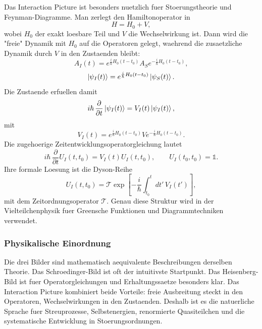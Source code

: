 Das Interaction Picture ist besonders nuetzlich
fuer Stoerungstheorie und Feynman-Diagramme. Man
zerlegt den Hamiltonoperator in
\begin{equation}
  H=H_0+V,
\end{equation}
wobei $H_0$ der exakt loesbare Teil und $V$ die Wechselwirkung ist. Dann wird die "freie" Dynamik mit $H_0$ auf die Operatoren gelegt, waehrend die zusaetzliche Dynamik durch $V$ in den Zustaenden bleibt:
\begin{equation}
  A_I(t)=e^{\frac{i}{\hbar}H_0(t-t_0)}A_Se^{-\frac{i}{\hbar}H_0(t-t_0)},
\end{equation}
\begin{equation}
  \left|\psi_I(t)\right\rangle=e^{\frac{i}{\hbar}H_0(t-t_0)}\left|\psi_S(t)\right\rangle.
\end{equation}
Die Zustaende erfuellen damit
\begin{equation}
  i\hbar\,\frac{\partial}{\partial t}\left|\psi_I(t)\right\rangle=V_I(t)\left|\psi_I(t)\right\rangle,
\end{equation}
mit
\begin{equation}
  V_I(t)=e^{\frac{i}{\hbar}H_0(t-t_0)}Ve^{-\frac{i}{\hbar}H_0(t-t_0)}.
\end{equation}
Die zugehoerige Zeitentwicklungsoperatorgleichung lautet
\begin{equation}
  i\hbar\,\frac{\partial}{\partial t}U_I(t,t_0)=V_I(t)U_I(t,t_0),
  \qquad U_I(t_0,t_0)=\mathds{1}.
\end{equation}
Ihre formale Loesung ist die Dyson-Reihe
\begin{equation}
  U_I(t,t_0)=\mathcal{T}\exp\left[-\frac{i}{\hbar}\int_{t_0}^{t}dt'\,V_I(t')\right],
\end{equation}
mit dem Zeitordnungsoperator $\mathcal{T}$. Genau diese Struktur wird in der Vielteilchenphysik fuer Greensche Funktionen und Diagrammtechniken verwendet.

\subsubsection*{Physikalische Einordnung}

Die drei Bilder sind mathematisch aequivalente
Beschreibungen derselben Theorie. Das
Schroedinger-Bild ist oft der intuitivste
Startpunkt. Das Heisenberg-Bild ist fuer
Operatorgleichungen und Erhaltungssaetze
besonders klar. Das Interaction Picture
kombiniert beide Vorteile: freie Ausbreitung
steckt in den Operatoren, Wechselwirkungen in den
Zustaenden. Deshalb ist es die natuerliche
Sprache fuer Streuprozesse, Selbstenergien,
renormierte Quasiteilchen und die systematische
Entwicklung in Stoerungsordnungen.
